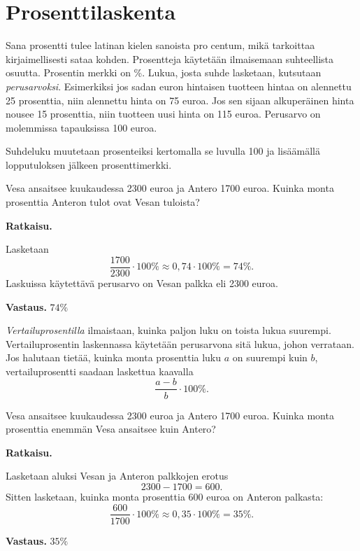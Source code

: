 \chapter{Prosenttilaskenta}

Sana prosentti tulee latinan kielen sanoista pro centum, mikä tarkoittaa
kirjaimellisesti sataa kohden. Prosentteja käytetään ilmaisemaan suhteellista
osuutta. Prosentin merkki on \%. Lukua, josta suhde lasketaan, kutsutaan \emph{perusarvoksi}. Esimerkiksi jos sadan euron hintaisen tuotteen hintaa on alennettu 25 prosenttia, niin alennettu hinta on 75 euroa. Jos sen sijaan alkuperäinen hinta nousee 15 prosenttia, niin tuotteen uusi hinta on 115 euroa. Perusarvo on molemmissa tapauksissa 100 euroa.



Suhdeluku muutetaan prosenteiksi kertomalla se luvulla 100 ja lisäämällä
lopputuloksen jälkeen prosenttimerkki.

\begin{esimerkki}
	Vesa ansaitsee kuukaudessa 2300 euroa ja Antero 1700 euroa.
    Kuinka monta prosenttia Anteron tulot ovat Vesan tuloista? 
    
    {\bf Ratkaisu.}
    
    Lasketaan
    \[
    \frac{1700}{2300} \cdot 100 \% \approx 0,74\cdot 100 \% = 74 \%.
    \]
    Laskuissa käytettävä perusarvo on Vesan palkka eli 2300 euroa.
    
    {\bf Vastaus.}
     $74 \%$
\end{esimerkki}


\emph{Vertailuprosentilla} ilmaistaan, kuinka paljon luku on toista lukua suurempi.
Vertailuprosentin laskennassa käytetään perusarvona sitä lukua, johon
verrataan. Jos halutaan tietää, kuinka monta prosenttia luku $a$ on suurempi kuin $b$, vertailuprosentti saadaan laskettua kaavalla
\[
\frac{a-b}{b} \cdot 100 \%.
\]

\begin{esimerkki}
    Vesa ansaitsee kuukaudessa 2300 euroa ja Antero 1700 euroa.
    Kuinka monta prosenttia enemmän Vesa ansaitsee kuin Antero?
    
    {\bf Ratkaisu.}
    
    Lasketaan aluksi Vesan ja Anteron palkkojen erotus
    \[
    2300-1700 = 600.
    \]
    Sitten lasketaan, kuinka monta prosenttia 600 euroa on Anteron palkasta:
    \[
    \frac{600}{1700} \cdot 100 \% \approx 0,35\cdot 100\% = 35 \%.
    \]
    
    {\bf Vastaus.}
    $35 \%$
\end{esimerkki}

